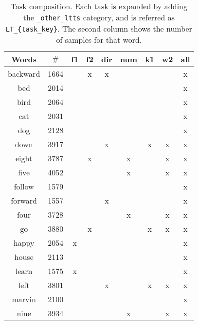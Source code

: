 
\begin{table}[h!]
    \centering
    \caption{Task composition.
    Each task is expanded by adding the
    \texttt{\_other\_ltts}
    category,
    and is referred as
    \texttt{LT\_\{task\_key\}}.
    The second column shows the number of samples for that word.
    }
    \label{tab:task_word_composition}
    \begin{tabular}{|c|c|ccccccc|}
        \hline
        Words & $\#$          &f1 &f2 &dir&num&k1 &w2 &all \\
        \hline
        backward & 1664       &   & x & x &   &   &   & x  \\
        bed & 2014            &   &   &   &   &   &   & x  \\
        bird & 2064           &   &   &   &   &   &   & x  \\
        cat & 2031            &   &   &   &   &   &   & x  \\
        \hline
        dog & 2128            &   &   &   &   &   &   & x  \\
        down & 3917           &   &   & x &   & x & x & x  \\
        eight & 3787          &   & x &   & x &   & x & x  \\
        five & 4052           &   &   &   & x &   & x & x  \\
        \hline
        follow & 1579         &   &   &   &   &   &   & x  \\
        forward & 1557        &   &   & x &   &   &   & x  \\
        four & 3728           &   &   &   & x &   & x & x  \\
        go & 3880             &   & x &   &   & x & x & x  \\
        \hline
        happy & 2054          & x &   &   &   &   &   & x  \\
        house & 2113          &   &   &   &   &   &   & x  \\
        learn & 1575          & x &   &   &   &   &   & x  \\
        left & 3801           &   &   & x &   & x & x & x  \\
        \hline
        marvin & 2100         &   &   &   &   &   &   & x  \\
        nine & 3934           &   &   &   & x &   & x & x  \\

\end{tabular}
\end{table}
